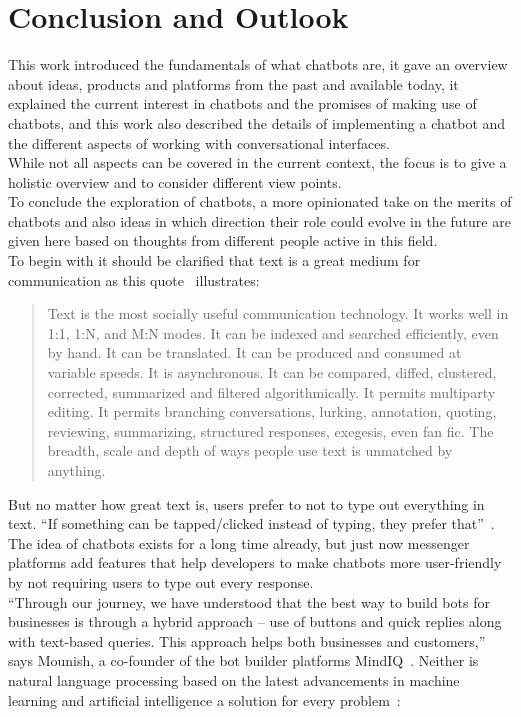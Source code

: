 \chapter{Conclusion and Outlook}


This work introduced the fundamentals of what chatbots are,
it gave an overview about ideas, products and platforms from the past and available today,
it explained the current interest in chatbots and the promises of making use of chatbots,
and this work also described the details of implementing a chatbot and the different aspects of working with conversational interfaces.
\\

While not all aspects can be covered in the current context,
the focus is to give a holistic overview and to consider different view points.
\\

To conclude the exploration of chatbots, a more opinionated take on the merits of chatbots
and also ideas in which direction their role could evolve in the future are given here
based on thoughts from different people active in this field.
\\

To begin with it should be clarified that text is a great medium for communication as this quote~\cite{futuretext} illustrates:

\begin{quote}
Text is the most socially useful communication technology. It works well in 1:1, 1:N, and M:N modes. It can be indexed and searched efficiently, even by hand. It can be translated. It can be produced and consumed at variable speeds. It is asynchronous. It can be compared, diffed, clustered, corrected, summarized and filtered algorithmically. It permits multiparty editing. It permits branching conversations, lurking, annotation, quoting, reviewing, summarizing, structured responses, exegesis, even fan fic. The breadth, scale and depth of ways people use text is unmatched by anything.
\end{quote}

But no matter how great text is, users prefer to not to type out everything in text.
``If something can be tapped/clicked instead of typing, they prefer that''~\cite{chatbotslife}.
\\
The idea of chatbots exists for a long time already,
but just now messenger platforms add features that help developers to make chatbots more user-friendly by not requiring users to type out every response.
\\
``Through our journey, we have understood that the best way to build bots for businesses is through a hybrid approach – use of buttons and quick replies along with text-based queries. This approach helps both businesses and customers,'' says Mounish, a co-founder of the bot builder platforms MindIQ~\cite{techinasia}.
Neither is natural language processing based on the latest advancements in machine learning and artificial intelligence a solution for every problem~\cite{neednlp}:

